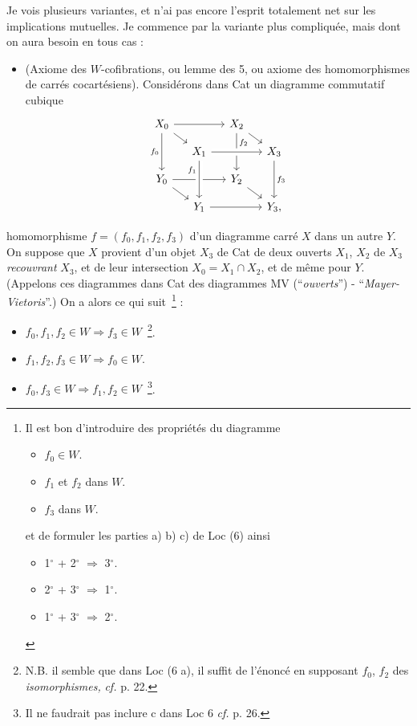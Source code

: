 Je vois plusieurs variantes, et n'ai pas encore l'esprit totalement net sur les implications mutuelles. Je commence par la variante plus compliquée, mais dont on aura besoin en tous cas :

\begin{itemize}[leftmargin=5em,labelwidth=4em,align=left]
\item[\textbf{Loc 6}] (Axiome des $W$-cofibrations, ou lemme des 5, ou axiome des homomorphismes de carrés cocartésiens). Considérons dans Cat un diagramme commutatif cubique
\[
\begin{tikzcd}[row sep=small,column sep=small]
X_0 \arrow[rr] \arrow[dr] \arrow[dd,"f_0"'] & & X_2 \arrow[dr] \arrow[dd,"f_2" near start] & \\
& X_1 \arrow[rr,crossing over] & & X_3 \arrow[dd,"f_3"] \\
Y_0 \arrow[rr] \arrow[dr] & & Y_2 \arrow[dr] & \\
& Y_1 \arrow[rr] \arrow[from=uu,crossing over,"f_1"' near start] & & Y_3,
\end{tikzcd}
\]
\end{itemize}
homomorphisme $f=(f_0,f_1,f_2,f_3)$ d'un diagramme carré $X$ dans un autre $Y$. On suppose que $X$ provient d'un objet $X_3$ de Cat de deux ouverts $X_1$, $X_2$ de $X_3$ \textit{recouvrant} $X_3$, et de leur intersection $X_0=X_1\cap X_2$, et de même pour $Y$. (Appelons ces diagrammes dans Cat des diagrammes MV (“\textit{ouverts}”) - “\textit{Mayer-Vietoris}”.) On a alors ce qui suit~\footnote[9]{Il est bon d'introduire des propriétés du diagramme
\begin{itemize}[leftmargin=3em,labelwidth=2.5em,align=right]
\item[1$^{\circ}$)] $f_0\in W$.
\item[2$^{\circ}$)] $f_1$ et $f_2$ dans $W$.
\item[3$^{\circ}$)] $f_3$ dans $W$.
\end{itemize}
et de formuler les parties a) b) c) de Loc (6) ainsi
\begin{itemize}[leftmargin=3em,labelwidth=2.5em,align=right]
\item[a)] 1$^{\circ}$ + 2$^{\circ}$ $\Longrightarrow$ 3$^{\circ}$.
\item[b)] 2$^{\circ}$ + 3$^{\circ}$ $\Longrightarrow$ 1$^{\circ}$.
\item[c)] 1$^{\circ}$ + 3$^{\circ}$ $\Longrightarrow$ 2$^{\circ}$.
\end{itemize}} :
\begin{itemize}[leftmargin=3em,labelwidth=2.5em,align=right]
\item[a)] $f_0,f_1,f_2\in W\Longrightarrow f_3\in W$~\footnote[10]{N.B. il semble que dans Loc (6 a), il suffit de l'énoncé en supposant $f_0$, $f_2$ des \textit{isomorphismes,} \textit{cf.} p. 22.}.
\item[b)] $f_1,f_2,f_3\in W\Longrightarrow f_0\in W$.
\item[c)] $f_0,f_3\in W\Longrightarrow f_1,f_2\in W$~\footnote[11]{Il ne faudrait pas inclure c dans Loc 6 \textit{cf.} p. 26.}.
\end{itemize}
